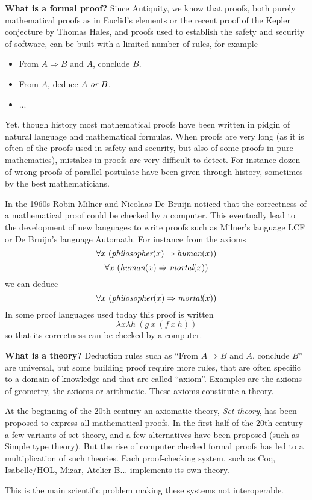 {\bf What is a formal proof?}
Since Antiquity, we know that proofs, both purely mathematical proofs
as in Euclid's elements or the recent proof of the Kepler conjecture
by Thomas Hales, and proofs used to establish the safety and security
of software, can be built with a limited number of rules, for example
\begin{itemize}
\item From $A \Rightarrow B$ and $A$, conclude $B$.
\item From $A$, deduce $A~\mbox{\it or}~B$.
\item ...
\end{itemize}
Yet, though history most mathematical proofs have been written in
pidgin of natural language and mathematical formulas. When proofs are
very long (as it is often of the proofs used in safety and security, but
also of some proofs in pure mathematics), mistakes in proofs are very
difficult to detect. For instance dozen of wrong proofs of parallel postulate
have been given through history, sometimes by the best mathematicians.

In the 1960s Robin Milner and Nicolaas De Bruijn noticed that the
correctness of a mathematical proof could be checked by a
computer. This eventually lead to the development of new languages to
write proofs such as Milner's language {\sc LCF} or De Bruijn's
language {\sc Automath}.
For instance from the axioms
$$\forall x~(\mbox{\em philosopher}(x) \Rightarrow \mbox{\em human}(x))$$
$$\forall x~(\mbox{\em human}(x) \Rightarrow \mbox{\em mortal}(x))$$
we can deduce
$$\forall x~(\mbox{\em philosopher}(x) \Rightarrow \mbox{\em mortal}(x))$$
In some proof languages used today this proof is written
$$\lambda x \lambda h~(g~x~(f~x~h))$$
so that its correctness can be checked by a computer.

{\bf What is a theory?} Deduction rules such as ``From $A \Rightarrow
B$ and $A$, conclude $B$'' are universal, but some building proof
require more rules, that are often specific to a domain of knowledge
and that are called ``axiom''. Examples are the axioms of geometry,
the axioms or arithmetic. These axioms constitute a theory.

At the beginning of the 20th century an axiomatic theory, {\em Set
  theory}, has been proposed to express all mathematical proofs. In
the first half of the 20th century a few variants of set theory, and a
few alternatives have been proposed (such as Simple type theory).  But
the rise of computer checked formal proofs has led to a multiplication
of such theories. Each proof-checking system, such as {\sc Coq}, {\sc
  Isabelle/HOL}, {\sc Mizar}, {\sc Atelier B}... implements its own
theory.

This is the main scientific problem making these systems not
interoperable.








